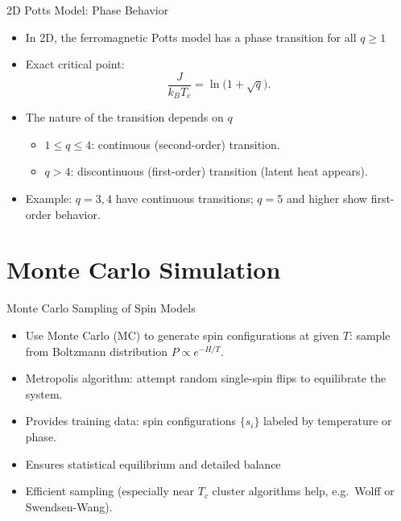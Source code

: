\documentclass{beamer}
\begin{document}
\begin{frame}{2D Potts Model: Phase Behavior}
 \begin{itemize}
   \item In 2D, the ferromagnetic Potts model has a phase transition for all $q\ge1$ 
   \item Exact critical point:
     \[
       \frac{J}{k_B T_c} = \ln\!\bigl(1+\sqrt{q}\bigr).
     \]
   \item The nature of the transition depends on $q$ 
     \begin{itemize}
       \item $1 \le q \le 4$: continuous (second-order) transition.
       \item $q > 4$: discontinuous (first-order) transition (latent heat appears).
     \end{itemize}
   \item Example: $q=3,4$ have continuous transitions; $q=5$ and higher show first-order behavior.
 \end{itemize}
\end{frame}

\section{Monte Carlo Simulation}

\begin{frame}{Monte Carlo Sampling of Spin Models}
 \begin{itemize}
   \item Use Monte Carlo (MC) to generate spin configurations at given $T$:
     sample from Boltzmann distribution $P\propto e^{-H/T}$.
   \item Metropolis algorithm: attempt random single-spin flips to equilibrate the system.
   \item Provides training data: spin configurations $\{s_i\}$ labeled by temperature or phase.
   \item Ensures statistical equilibrium and detailed balance 
   \item Efficient sampling (especially near $T_c$ cluster algorithms help, e.g.\ Wolff or Swendsen-Wang).
 \end{itemize}
\end{frame}
\end{document}
